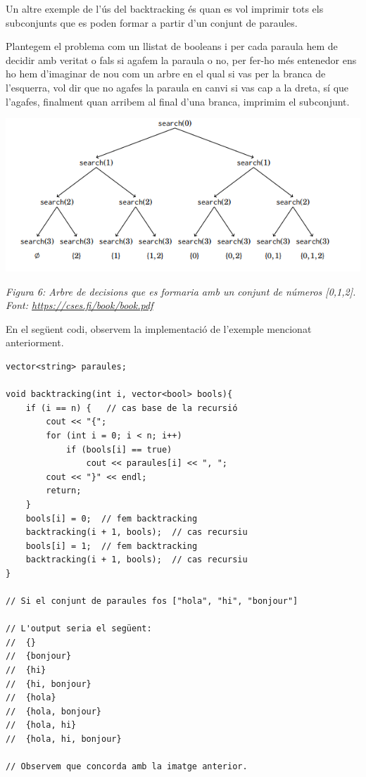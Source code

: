 Un altre exemple de l'ús del backtracking és quan es vol imprimir tots els subconjunts que es poden formar a partir d’un conjunt de paraules.

Plantegem el problema com un llistat de booleans i per cada paraula hem de decidir amb veritat o fals si agafem la paraula o no, per fer-ho més entenedor ens ho hem d'imaginar de nou com un arbre en el qual si vas per la branca de l'esquerra, vol dir que no agafes la paraula en canvi si vas cap a la dreta, sí que l'agafes, finalment quan arribem al final d'una branca, imprimim el subconjunt.


\begin{center}
    \includegraphics[width=.9 \textwidth]{back2.png}
    \caption{\emph{Figura 6: Arbre de decisions que es formaria amb un conjunt de números [0,1,2]. Font: \url{https://cses.fi/book/book.pdf}}}
\end{center}

\newpage

En el següent codi, observem la implementació de l'exemple mencionat anteriorment. \newline


\begin{lstlisting}
vector<string> paraules;

void backtracking(int i, vector<bool> bools){
    if (i == n) {   // cas base de la recursió
        cout << "{";
        for (int i = 0; i < n; i++)
            if (bools[i] == true)
                cout << paraules[i] << ", ";
        cout << "}" << endl;
        return;
    }
    bools[i] = 0;  // fem backtracking
    backtracking(i + 1, bools);  // cas recursiu
    bools[i] = 1;  // fem backtracking
    backtracking(i + 1, bools);  // cas recursiu
}

// Si el conjunt de paraules fos ["hola", "hi", "bonjour"]

// L'output seria el següent:
//  {}
//  {bonjour}
//  {hi}
//  {hi, bonjour}
//  {hola}
//  {hola, bonjour}
//  {hola, hi}
//  {hola, hi, bonjour}

// Observem que concorda amb la imatge anterior.
\end{lstlisting}






